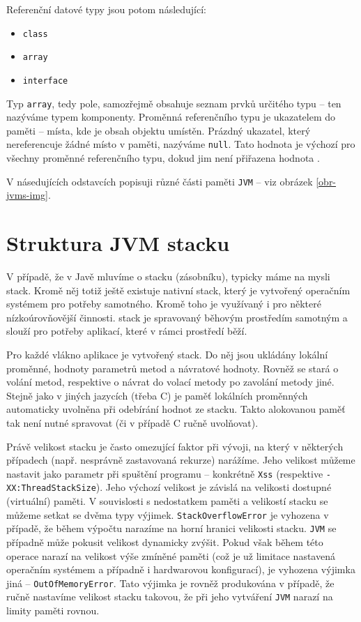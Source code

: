Referenční datové typy jsou potom následující:
\label{ref-types}
\begin{itemize}
	\item \texttt{class}
	\item \texttt{array}
	\item \texttt{interface}
\end{itemize}

Typ \texttt{array}, tedy pole, samozřejmě obsahuje seznam prvků určitého typu -- ten nazýváme typem komponenty. Proměnná referenčního typu je ukazatelem do paměti -- místa, kde je obsah objektu umístěn. Prázdný ukazatel, který nereferencuje žádné místo v paměti, nazýváme \texttt{null}. Tato hodnota je výchozí pro všechny proměnné referenčního typu, dokud jim není přiřazena hodnota \cite{jvms}. 

V násedujících odstavcích popisuji různé části paměti \texttt{JVM} -- viz obrázek \ref{obr-jvms-img}.

\section{Struktura JVM stacku}
V případě, že v Javě mluvíme o stacku (zásobníku), typicky máme na mysli  stack. Kromě něj totiž ještě existuje nativní stack, který je vytvořený operačním systémem pro potřeby  samotného. Kromě toho je využívaný i pro některé nízkoúrovňovější činnosti.  stack je spravovaný běhovým prostředím samotným a slouží pro potřeby aplikací, které v rámci prostředí běží.

Pro každé vlákno aplikace je vytvořený stack. Do něj jsou ukládány lokální proměnné, hodnoty parametrů metod a návratové hodnoty. Rovněž se stará o volání metod, respektive o návrat do volací metody po zavolání metody jiné. Stejně jako v jiných jazycích (třeba C) je paměť lokálních proměnných automaticky uvolněna při odebírání hodnot ze stacku. Takto alokovanou paměť tak není nutné spravovat  (či v případě C ručně uvolňovat).

Právě velikost  stacku je často omezující faktor při vývoji, na který v některých případech (např. nesprávně zastavovaná rekurze) narážíme. Jeho velikost můžeme nastavit jako parametr při spuštění programu -- konkrétně \texttt{Xss} (respektive \texttt{-XX:ThreadStackSize}). Jeho výchozí velikost je závislá na velikosti dostupné (virtuální) paměti. V souvislosti s nedostatkem paměti a velikostí stacku se můžeme setkat se dvěma typy výjimek. \texttt{Stack\-Overflow\-Error} je vyhozena v případě, že během výpočtu narazíme na horní hranici velikosti stacku. \texttt{JVM} se případně může pokusit velikost dynamicky zvýšit. Pokud však během této operace narazí na velikost výše zmíněné paměti (což je už limitace nastavená operačním systémem a případně i hardwarovou konfigurací), je vyhozena výjimka jiná -- \texttt{OutOfMemoryError}. Tato výjimka je rovněž produkována v případě, že ručně nastavíme velikost stacku takovou, že při jeho vytváření \texttt{JVM} narazí na limity paměti rovnou.

